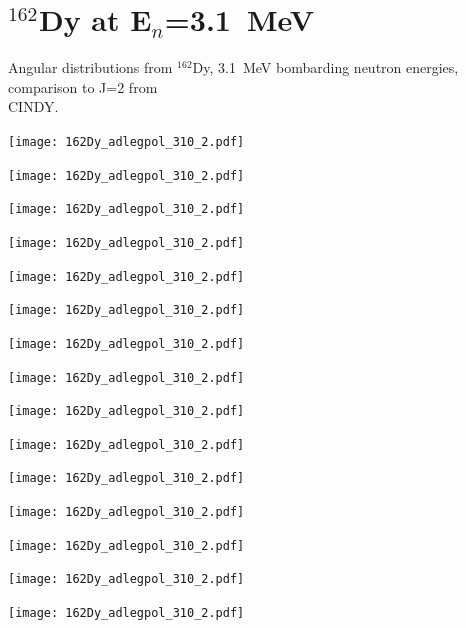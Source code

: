 \section{$^{162}$Dy at E$_n$=3.1~MeV}\label{app:AD_Dy_31}%
Angular distributions from $^{162}$Dy, 3.1~MeV bombarding neutron energies, comparison to J=2 from {\\ CINDY}.
\begin{center}
\texttt{[image: 162Dy\_adlegpol\_310\_2.pdf]}
\end{center}
\begin{center}
\texttt{[image: 162Dy\_adlegpol\_310\_2.pdf]}
\end{center}
\begin{center}
\texttt{[image: 162Dy\_adlegpol\_310\_2.pdf]}
\end{center}
\begin{center}
\texttt{[image: 162Dy\_adlegpol\_310\_2.pdf]}
\end{center}
\begin{center}
\texttt{[image: 162Dy\_adlegpol\_310\_2.pdf]}
\end{center}
\begin{center}
\texttt{[image: 162Dy\_adlegpol\_310\_2.pdf]}
\end{center}
\begin{center}
\texttt{[image: 162Dy\_adlegpol\_310\_2.pdf]}
\end{center}
\begin{center}
\texttt{[image: 162Dy\_adlegpol\_310\_2.pdf]}
\end{center}
\begin{center}
\texttt{[image: 162Dy\_adlegpol\_310\_2.pdf]}
\end{center}
\begin{center}
\texttt{[image: 162Dy\_adlegpol\_310\_2.pdf]}
\end{center}
\begin{center}
\texttt{[image: 162Dy\_adlegpol\_310\_2.pdf]}
\end{center}
\begin{center}
\texttt{[image: 162Dy\_adlegpol\_310\_2.pdf]}
\end{center}
\begin{center}
\texttt{[image: 162Dy\_adlegpol\_310\_2.pdf]}
\end{center}
\begin{center}
\texttt{[image: 162Dy\_adlegpol\_310\_2.pdf]}
\end{center}
\begin{center}
\texttt{[image: 162Dy\_adlegpol\_310\_2.pdf]}
\end{center}
